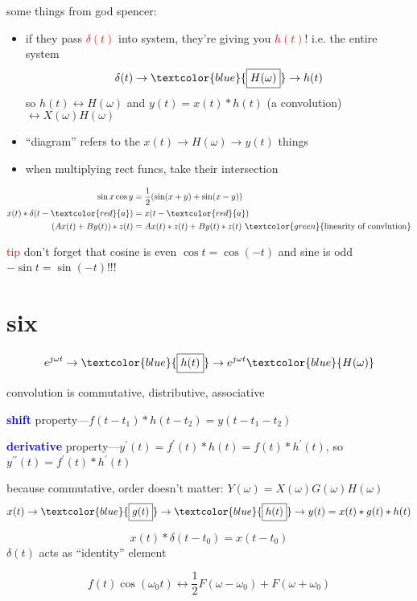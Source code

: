 \documentclass[a5paper, fleqn]{article}
\newcommand{\vocab}[1]{\textbf{\textcolor{blue}{#1}}}
\newcommand{\emf}[1]{\textcolor{red}{#1}}
\newcommand{\note}[1]{\textcolor{green}{#1}}
\newcommand{\eq}[1]{\textcolor{red}{$#1$}}
\begin{document}
some things from god spencer:
\begin{itemize}
  \item if they pass \eq{\delta(t)} into system, they're giving you \eq{h(t)}! i.e. the entire system
        \[\delta(t) \to \textcolor{blue}{\boxed{H(\omega)}} \to h(t)\]
        so $h(t) \leftrightarrow H(\omega)$ and $y(t) = x(t) * h(t)$ (a convolution) $\leftrightarrow X(\omega)H(\omega)$
  \item ``diagram'' refers to the $x(t) \to \boxed{H(\omega)} \to y(t)$ things
  \item when multiplying rect funcs, take their intersection
\end{itemize}
\begin{align*}
  \sin x \cos y              & = \frac{1}{2}(\sin(x + y) + \sin(x - y))                              \\
  x(t) * \delta(t - \emf{a}) & = x(t - \emf{a})                                                      \\
  (Ax(t) + By(t)) * z(t)     & = Ax(t) * z(t) + By(t) * z(t) ~ \note{\text{linearity of convlution}}
\end{align*}

\emf{tip} don't forget that cosine is even $\cos t = \cos(-t)$ and sine is odd $-\sin t = \sin(-t)$!!!

\section*{\textcolor{primary}{six}}

\[e^{j\omega t} \to \textcolor{blue}{\boxed{h(t)}} \to e^{j\omega t} \textcolor{blue}{H(\omega)}\]

convolution is commutative, distributive, associative

\vocab{shift} property---$f(t - t_1) * h(t - t_2) = y(t - t_1 - t_2)$

\vocab{derivative} property---$y^\prime(t) = f^\prime(t) * h(t) = f(t) * h^\prime(t)$, so $y^{\prime\prime}(t) = f^\prime(t) * h^\prime(t)$

because commutative, order doesn't matter: $Y(\omega) = X(\omega) G(\omega) H(\omega)$
\[x(t) \to \textcolor{blue}{\boxed{g(t)}} \to \textcolor{blue}{\boxed{h(t)}} \to y(t) = x(t) * g(t) * h(t)\]

\[x(t) * \delta(t - t_0) = x(t - t_0)\]
$\delta(t)$ acts as ``identity'' element

\[f(t) \cos(\omega_0 t) \leftrightarrow \frac{1}{2} F(\omega - \omega_0) + F(\omega + \omega_0)\]
\end{document}
